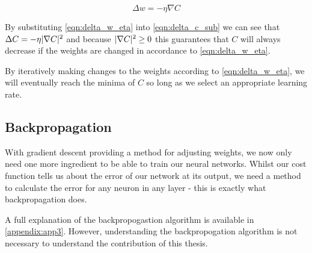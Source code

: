 \begin{equation} \label{eqn:delta_w_eta}
\Delta w = -\eta \nabla C
\end{equation}

By substituting \autoref{eqn:delta_w_eta} into \autoref{eqn:delta_c_sub} we can see that $ \Delta C = - \eta \lvert\nabla C\rvert^2$ and because $\lvert\nabla C\rvert^2 \geq 0$ this guarantees that $C$ will always decrease if the weights are changed in accordance to \autoref{eqn:delta_w_eta}.

By iteratively making changes to the weights according to \autoref{eqn:delta_w_eta}, we will eventually reach the minima of $C$ so long as we select an appropriate learning rate.

\subsection{Backpropagation}
With gradient descent providing a method for adjusting  weights, we now only need one more ingredient to be able to train our neural networks. Whilst our cost function tells us about the error of our network at its output, we need a method to calculate the error for any neuron in any layer - this is exactly what backpropagation does. 

A full explanation of the backpropogastion algorithm is available in \autoref{appendix:app3}. However, understanding the backpropogation algorithm is not necessary to understand the contribution of this thesis.


